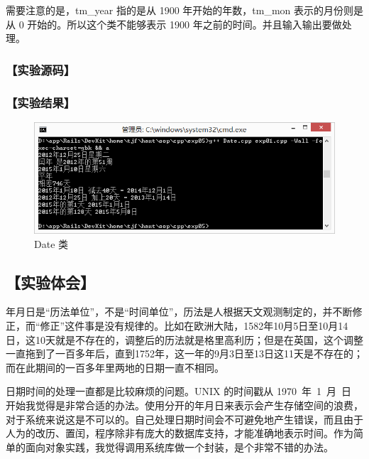 需要注意的是，tm\_year 指的是从 1900 年开始的年数，tm\_mon 表示的月份则是从 0 开始的。所以这个类不能够表示 1900 年之前的时间。并且输入输出要做处理。

\subsubsection*{【实验源码】}
{\linespread{1}}
{\linespread{1}}
{\linespread{1}}
\subsubsection*{【实验结果】}
\begin{figure}[htp]
\centering
\includegraphics[width=\textwidth]{exp05/exp01.png}
\caption{\label{out05_01}Date 类}
\end{figure}
\subsection*{【实验体会】}

年月日是“历法单位”，不是“时间单位”，历法是人根据天文观测制定的，并不断修正，而“修正”这件事是没有规律的。比如在欧洲大陆，1582年10月5日至10月14日，这10天就是不存在的，调整后的历法就是格里高利历；但是在英国，这个调整一直拖到了一百多年后，直到1752年，这一年的9月3日至13日这11天是不存在的；而在此期间的一百多年里两地的日期一直不相同。

日期时间的处理一直都是比较麻烦的问题。UNIX 的时间戳从 1970~年~1~月~日 开始我觉得是非常合适的办法。使用分开的年月日来表示会产生存储空间的浪费，对于系统来说这是不可以的。自己处理日期时间会不可避免地产生错误，而且由于人为的改历、置闰，程序除非有庞大的数据库支持，才能准确地表示时间。作为简单的面向对象实践，我觉得调用系统库做一个封装，是个非常不错的办法。
